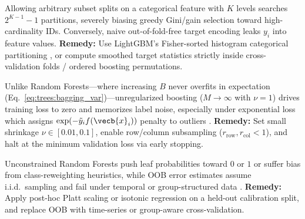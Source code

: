 \documentclass[../../../../master.tex]{subfiles}
\begin{document}
\begin{pitfall}
Allowing arbitrary subset splits on a categorical feature with $K$ levels searches $2^{K-1}-1$ partitions, severely biasing greedy Gini/gain selection toward high-cardinality IDs. Conversely, naive out-of-fold-free target encoding leaks $y_i$ into feature values. \textbf{Remedy:} Use LightGBM's Fisher-sorted histogram categorical partitioning , or compute smoothed target statistics strictly inside cross-validation folds / ordered boosting permutations.
\end{pitfall}

\begin{pitfall}
Unlike Random Forests---where increasing $B$ never overfits in expectation (Eq.~\eqref{eq:trees:bagging_var})---unregularized boosting ($M \to \infty$ with $\nu = 1$) drives training loss to zero and memorizes label noise, especially under exponential loss which assigns $\exp(-\tilde{y}_i f(\vecb{x}_i))$ penalty to outliers . \textbf{Remedy:} Set small shrinkage $\nu \in [0.01, 0.1]$, enable row/column subsampling ($r_{\mathrm{row}}, r_{\mathrm{col}} < 1$), and halt at the minimum validation loss via early stopping.
\end{pitfall}

\begin{pitfall}
Unconstrained Random Forests push leaf probabilities toward $0$ or $1$ or suffer bias from class-reweighting heuristics, while OOB error estimates assume i.i.d.\ sampling and fail under temporal or group-structured data . \textbf{Remedy:} Apply post-hoc Platt scaling or isotonic regression on a held-out calibration split, and replace OOB with time-series or group-aware cross-validation.
\end{pitfall}
\end{document}
